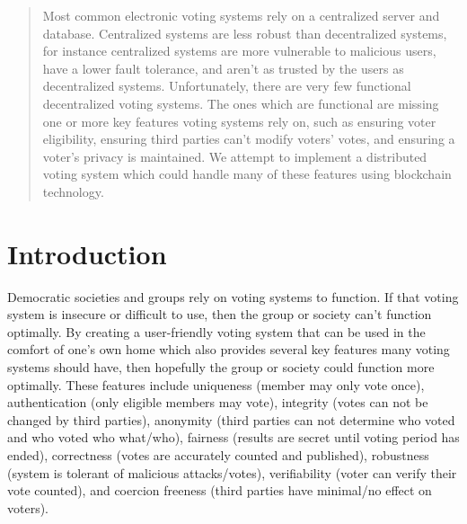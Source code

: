 \documentclass[conference]{IEEEtran}
\begin{document}




\maketitle

\begin{abstract}
Most common electronic voting systems rely on a centralized server and database. Centralized systems are less robust than decentralized systems, for instance centralized systems are more vulnerable to malicious users, have a lower fault tolerance, and aren’t as trusted by the users as decentralized systems. Unfortunately, there are very few functional decentralized voting systems. The ones which are functional are missing one or more key features voting systems rely on, such as ensuring voter eligibility, ensuring third parties can’t modify voters’ votes, and ensuring a voter’s privacy is maintained. We attempt to implement a distributed voting system which could handle many of these features using blockchain technology.
\end{abstract}





%
\IEEEpeerreviewmaketitle



\section{Introduction}
Democratic societies and groups rely on voting systems to function. If that voting system is insecure or difficult to use, then the group or society can’t function optimally. By creating a user-friendly voting system that can be used in the comfort of one’s own home which also provides several key features many voting systems should have, then hopefully the group or society could function more optimally. These features include uniqueness (member may only vote once), authentication (only eligible members may vote), integrity (votes can not be changed by third parties), anonymity (third parties can not determine who voted and who voted who what/who), fairness (results are secret until voting period has ended), correctness (votes are accurately counted and published), robustness (system is tolerant of malicious attacks/votes), verifiability (voter can verify their vote counted), and coercion freeness (third parties have minimal/no effect on voters).
\end{document}
